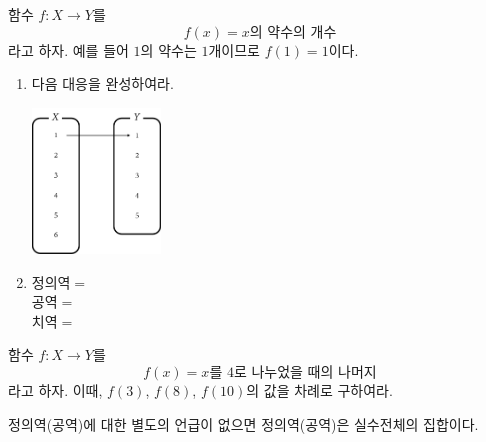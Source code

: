 \documentclass{oblivoir}
\begin{document}
%
\label{function4}
함수 \(f:X\to Y\)를
\[f(x)=x\text{의 약수의 개수}\]
라고 하자.
예를 들어 \(1\)의 약수는 \(1\)개이므로 \(f(1)=1\)이다.
\begin{enumerate}
\item
다음 대응을 완성하여라.
\begin{center}
\includegraphics[width=0.27\textwidth]{function_4}
\end{center}
\item
정의역$=$\\
공역$=$\\
치역$=$
\end{enumerate}

%
\label{function5}
 함수 \(f:X\to Y\)를
\[f(x)=x\text{를 4로 나누었을 때의 나머지}\]
라고 하자.
이때, \(f(3)\), \(f(8)\), \(f(10)\)의 값을 차례로 구하여라.

정의역(공역)에 대한 별도의 언급이 없으면
정의역(공역)은 실수전체의 집합이다.
\end{document}
